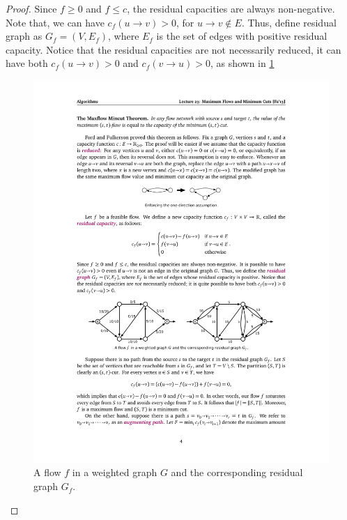 \begin{proof}
Since $f \geq 0$ and $f \leq c$, the residual capacities are always non-negative.
Note that, we can have $c_f(u \rightarrow v) > 0$, for $u \rightarrow v \notin E$.
Thus, define residual graph as $G_f = (V, E_f)$,
where $E_f$ is the set of edges with positive residual capacity.
Notice that the residual capacities are not necessarily reduced,
it can have both $c_f(u \rightarrow v) > 0$ and $c_f(v \rightarrow u) > 0$,
as shown in \cref{fig:residualGraphExample}
\begin{figure}[H]
    \centering
    \includegraphics[width=.9\textwidth]{fig/residualGraphExample}
    \caption{A flow $f$ in a weighted graph $G$ and the corresponding residual graph $G_f$.}
    \label{fig:residualGraphExample}
\end{figure}


\end{proof}
